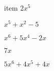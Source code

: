 \documentclass{article}
\begin{document}
\begin{multicols}{2}
item $2x^{5}$\item $x^{5}+x^2-5$\item $x^{6}+5x^{4}-2x$\item $7x$\item $5x^{6}+4x^{5}+4x$\item 
\end{multicols}
\end{document}
